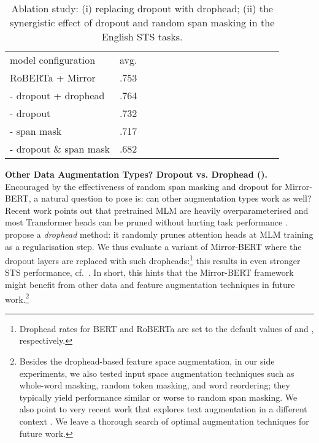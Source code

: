 \documentclass[11pt]{article}
\begin{document}
\begin{table}[!t]
\centering
\fontsize{10}{10}\selectfont
\def\arraystretch{0.9}
\begin{tabularx}{\linewidth}{XXXXX XXXXXXXXXXX}
\cmidrule[1.0pt]{1-10}
model configuration & avg. \\
\cmidrule[1.0pt]{1-10}
RoBERTa + Mirror & .753 \\
\hdashline
- dropout + drophead & .764   \\
\hdashline
 - dropout & .732  \\
 - span mask & .717  \\
 - dropout \& span mask & .682  \\
\cmidrule[1.0pt]{1-10}
\end{tabularx}
\caption{Ablation study: (i) replacing dropout with drophead; (ii) the synergistic effect of dropout and random span masking in the English STS tasks.}
\label{tab:synersitic}
\end{table}

\vspace{1.5mm}
\noindent \textbf{Other Data Augmentation Types? Dropout vs. Drophead ().}
Encouraged by the effectiveness of random span masking and dropout for Mirror-BERT, a natural question to pose is: can other augmentation types work as well? 
Recent work points out that pretrained MLM are heavily overparameterised and most Transformer heads can be pruned without hurting task performance \citep{voita2019analyzing,kovaleva2019revealing,michel2019sixteen}. \citet{zhou2020scheduled} propose a \textit{drophead} method: it randomly prunes attention heads at MLM training as a regularisation step. We thus evaluate a variant of Mirror-BERT where the dropout layers are replaced with such dropheads:\footnote{Drophead rates for BERT and RoBERTa are set to the default values of  and , respectively.} this results in even stronger STS performance, cf.~. In short, this hints that the Mirror-BERT framework might benefit from other data and feature augmentation techniques in future work.\footnote{Besides the drophead-based feature space augmentation, in our side experiments, we also tested input space augmentation techniques such as whole-word masking, random token masking, and word reordering; they typically yield performance similar or worse to random span masking. We also point to very recent work that explores text augmentation in a different context \citep{wu2020clear,meng2021coco}. We leave a thorough search of optimal augmentation techniques for future work.}
\end{document}

